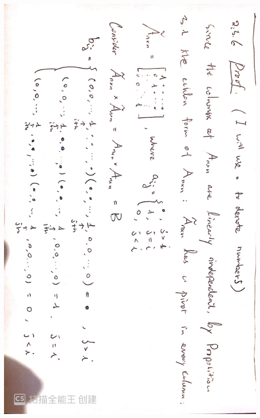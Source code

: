 \documentclass[]{book}
\theoremstyle{definition}
\newcommand{\0}{\mathbf{0}}
\begin{document}
\begin{enumerate}[label=\arabic*\degree]
\includegraphics[scale=0.15, angle=90]{images/7.jpg}\newline

\end{enumerate}
\end{document}
